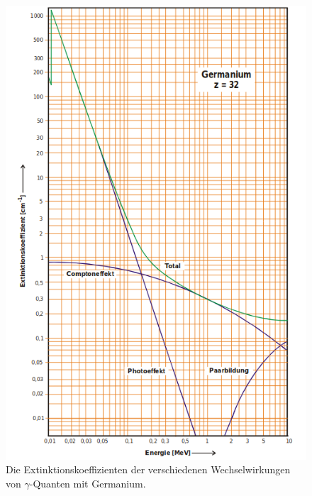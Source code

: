 \begin{figure}
  \centering
  \includegraphics[scale=0.8]{Wechselwirkungen.png}
  \caption{Die Extinktionskoeffizienten der verschiedenen Wechselwirkungen von $\gamma$-Quanten mit Germanium. \cite{Q1}}
  \label{abb:1}
\end{figure}

